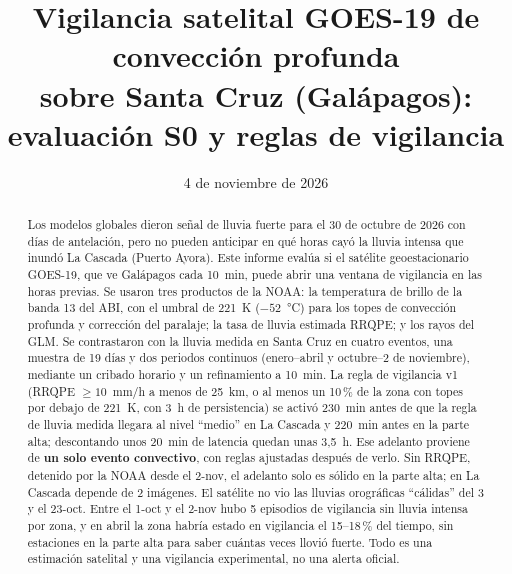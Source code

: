 \documentclass{sosg-informe}
\title{Vigilancia satelital GOES-19 de convección profunda\\sobre Santa Cruz (Galápagos):\\evaluación S0 y reglas de vigilancia}
\date{4 de noviembre de 2026}
\begin{document}
\maketitle

\begin{abstract}
Los modelos globales dieron señal de lluvia fuerte para el 30 de octubre de 2026 con días de antelación, pero no pueden anticipar en qué horas cayó la lluvia intensa que inundó La Cascada (Puerto Ayora). Este informe evalúa si el satélite geoestacionario GOES-19, que ve Galápagos cada 10~min, puede abrir una ventana de vigilancia en las horas previas. Se usaron tres productos de la NOAA: la temperatura de brillo de la banda 13 del ABI, con el umbral de 221~K ($-52$~°C) para los topes de convección profunda y corrección del paralaje; la tasa de lluvia estimada RRQPE; y los rayos del GLM. Se contrastaron con la lluvia medida en Santa Cruz en cuatro eventos, una muestra de 19 días y dos periodos continuos (enero--abril y octubre--2 de noviembre), mediante un cribado horario y un refinamiento a 10~min. La regla de vigilancia v1 (RRQPE $\geq 10$~mm/h a menos de 25~km, o al menos un 10\,\% de la zona con topes por debajo de 221~K, con 3~h de persistencia) se activó 230~min antes de que la regla de lluvia medida llegara al nivel \enquote{medio} en La Cascada y 220~min antes en la parte alta; descontando unos 20~min de latencia quedan unas 3,5~h. Ese adelanto proviene de \textbf{un solo evento convectivo}, con reglas ajustadas después de verlo. Sin RRQPE, detenido por la NOAA desde el 2-nov, el adelanto solo es sólido en la parte alta; en La Cascada depende de 2 imágenes. El satélite no vio las lluvias orográficas \enquote{cálidas} del 3 y el 23-oct. Entre el 1-oct y el 2-nov hubo 5 episodios de vigilancia sin lluvia intensa por zona, y en abril la zona habría estado en vigilancia el 15--18\,\% del tiempo, sin estaciones en la parte alta para saber cuántas veces llovió fuerte. Todo es una estimación satelital y una vigilancia experimental, no una alerta oficial.
\end{abstract}
\end{document}
